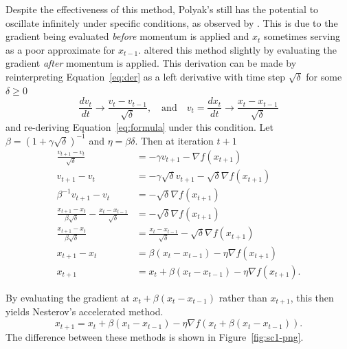 \documentclass{article}
\newcommand{\dv}[2]{\frac{d #1}{d #2}}
\begin{document}
Despite the effectiveness of this method, Polyak's still has the potential to
oscillate infinitely under specific conditions, as observed by
\citeauthor{lessard2016analysis}. This is due to the gradient being evaluated
\emph{before} momentum is applied and $x_t$ sometimes serving as a poor approximate
for $x_{t - 1}$. \citeauthor{nesterov1983method} altered this method slightly by
evaluating the gradient \emph{after} momentum is applied.  This derivation can
be made by reinterpreting Equation~\ref{eq:der} as a left derivative with time
step $\sqrt\delta$ for some $\delta \geq 0$
\begin{equation}
    \label{eq:der}
    \dv{v_t}{t} \rightarrow \frac{v_{t} - v_{t - 1}}{\sqrt{\delta}}, \quad \text{and}
    \quad v_{t} = \dv{x_t}{t} \rightarrow \frac{x_{t} - x_{t - 1}}{\sqrt{\delta}}
\end{equation}
and re-deriving Equation~\ref{eq:formula} under this condition. Let $\beta =
{\left( 1 + \gamma \sqrt{\delta} \right) }^{-1}$ and $\eta = \beta \delta$. Then
at iteration $t + 1$
\begin{equation}
    \label{eq:formula}
    \begin{aligned}
        \frac{v_{t + 1} - v_{t}}{\sqrt{\delta}} &= -\gamma v_{t + 1} -\nabla
        f(x_{t + 1}) \\
        v_{t + 1} - v_{t} &= -\gamma \sqrt{\delta}v_{t + 1} -\sqrt{\delta}\nabla
        f(x_{t + 1}) \\
        \beta^{-1}v_{t + 1} - v_{t} &= -\sqrt{\delta}\nabla
        f(x_{t + 1}) \\
        \frac{x_{t + 1} - x_{t}}{\beta\sqrt{\delta}} - \frac{x_{t} - x_{t - 1}}{\sqrt{\delta}} &=  -\sqrt{\delta}\nabla
        f(x_{t + 1}) \\
        \frac{x_{t + 1} - x_{t}}{\beta\sqrt{\delta}} &= \frac{x_{t} - x_{t -
        1}}{\sqrt{\delta}} - \sqrt{\delta}\nabla f(x_{t + 1}) \\
        x_{t + 1} - x_{t} &= \beta (x_{t} - x_{t -
        1}) - \eta \nabla f(x_{t + 1}) \\
        x_{t + 1} &= x_{t} + \beta (x_{t} - x_{t -
        1}) - \eta \nabla f(x_{t + 1}).
    \end{aligned}
\end{equation}

By evaluating the gradient at $x_t + \beta(x_t - x_{t - 1})$ rather than $x_{t +
1}$, this then yields Nesterov's accelerated method.
\begin{equation}
    x_{t + 1} = x_t + \beta (x_t - x_{t - 1}) - \eta \nabla f(x_t + \beta (x_t - x_{t -
    1})).
\end{equation}
The difference between these methods is shown in
Figure~\ref{fig:sc1-png}.
\end{document}
